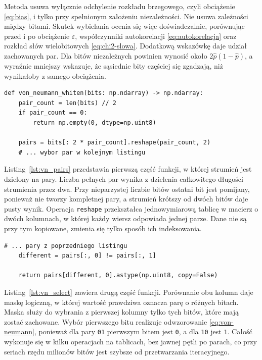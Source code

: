 Metoda usuwa wyłącznie odchylenie rozkładu brzegowego, czyli obciążenie
\eqref{eq:bias}, i tylko przy spełnionym założeniu niezależności. Nie usuwa
zależności między bitami. Skutek wybielania ocenia się więc doświadczalnie,
porównując przed i po obciążenie $\varepsilon$, współczynniki autokorelacji
\eqref{eq:autokorelacja} oraz rozkład słów wielobitowych
\eqref{eq:chi2-slowa}. Dodatkową wskazówkę daje udział zachowanych par. Dla
bitów niezależnych powinien wynosić około $2\hat{p}(1-\hat{p})$, a wyraźnie
mniejszy wskazuje, że sąsiednie bity częściej się zgadzają, niż wynikałoby
z samego obciążenia.

\begin{lstlisting}[style=pycode,
    caption={Wyodrębnienie par bitów (\texttt{von\_neumann.py})},
    label={lst:vn_pairs}]
def von_neumann_whiten(bits: np.ndarray) -> np.ndarray:
    pair_count = len(bits) // 2
    if pair_count == 0:
        return np.empty(0, dtype=np.uint8)

    pairs = bits[: 2 * pair_count].reshape(pair_count, 2)
    # ... wybor par w kolejnym listingu
\end{lstlisting}

Listing~\ref{lst:vn_pairs} przedstawia pierwszą część funkcji, w której
strumień jest dzielony na pary. Liczba pełnych par wynika z dzielenia
całkowitego długości strumienia przez dwa. Przy nieparzystej liczbie bitów
ostatni bit jest pomijany, ponieważ nie tworzy kompletnej pary, a strumień
krótszy od dwóch bitów daje pusty wynik. Operacja \texttt{reshape}
przekształca jednowymiarową tablicę w macierz o dwóch kolumnach, w której każdy
wiersz odpowiada jednej parze. Dane nie są przy tym kopiowane, zmienia się
tylko sposób ich indeksowania.

\begin{lstlisting}[style=pycode,
    caption={Wybór par o różnych bitach (\texttt{von\_neumann.py})},
    label={lst:vn_select}]
    # ... pary z poprzedniego listingu
    different = pairs[:, 0] != pairs[:, 1]

    return pairs[different, 0].astype(np.uint8, copy=False)
\end{lstlisting}

Listing~\ref{lst:vn_select} zawiera drugą część funkcji. Porównanie obu kolumn
daje maskę logiczną, w której wartość prawdziwa oznacza parę o różnych bitach.
Maska służy do wybrania z pierwszej kolumny tylko tych bitów, które mają
zostać zachowane. Wybór pierwszego bitu realizuje odwzorowanie
\eqref{eq:von-neumann}, ponieważ dla pary \texttt{01} pierwszym bitem jest
\texttt{0}, a dla \texttt{10} jest \texttt{1}. Całość wykonuje się w kilku
operacjach na tablicach, bez jawnej pętli po parach, co przy seriach rzędu
milionów bitów jest szybsze od przetwarzania iteracyjnego.

